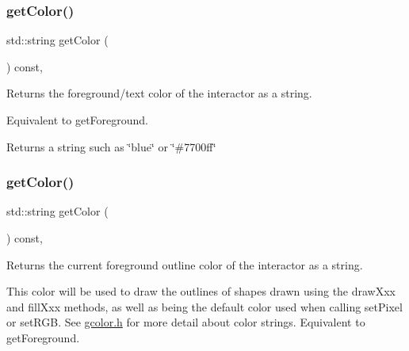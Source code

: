 \subsubsection{\texorpdfstring{get\+Color()}{getColor()}\hspace{0.1cm}{\footnotesize\ttfamily [1/2]}}
{\footnotesize\ttfamily std\+::string get\+Color (\begin{DoxyParamCaption}{ }\end{DoxyParamCaption}) const\hspace{0.3cm}{\ttfamily [virtual]}, {\ttfamily [inherited]}}



Returns the foreground/text color of the interactor as a string. 

Equivalent to get\+Foreground. \begin{DoxyReturn}{Returns}
a string such as \char`\"{}blue\char`\"{} or \char`\"{}\#7700ff\char`\"{} 
\end{DoxyReturn}
\mbox{\label{classsgl_1_1GDrawingSurface_aa061dfa488c31e18549d64363c1d0e34}} 
\subsubsection{\texorpdfstring{get\+Color()}{getColor()}\hspace{0.1cm}{\footnotesize\ttfamily [2/2]}}
{\footnotesize\ttfamily std\+::string get\+Color (\begin{DoxyParamCaption}{ }\end{DoxyParamCaption}) const\hspace{0.3cm}{\ttfamily [virtual]}, {\ttfamily [inherited]}}



Returns the current foreground outline color of the interactor as a string. 

This color will be used to draw the outlines of shapes drawn using the draw\+Xxx and fill\+Xxx methods, as well as being the default color used when calling set\+Pixel or set\+R\+GB. See \mbox{\hyperlink{gcolor_8h_source}{gcolor.\+h}} for more detail about color strings. Equivalent to get\+Foreground. \mbox{\label{classsgl_1_1GInteractor_a9635c7af766cdc3417f346683fa0e6c1}} 
